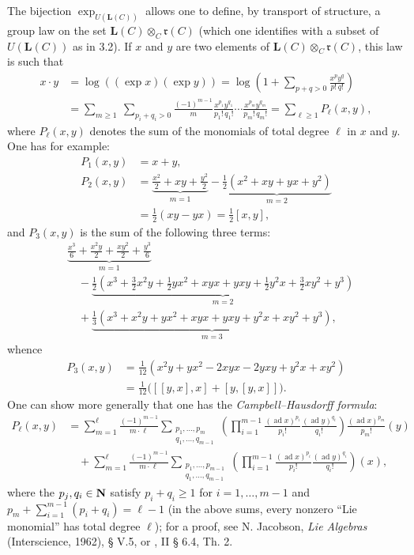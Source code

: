 The bijection $\exp_{U(\mathbf L(C))}$ allows one to define, by transport of structure, a group law on the set $\mathbf L(C)\otimes_C\mathfrak r(C)$ (which one identifies with a subset of $U(\mathbf L(C))$ as in 3.2). If $x$ and $y$ are two elements of $\mathbf L(C)\otimes_C\mathfrak r(C)$, this law is such that
\[
\begin{aligned}
x\cdot y&=\log((\exp x)(\exp y))=\log\left(1+\sum_{p+q>0}\frac{x^py^q}{p!\,q!}\right)\\
&=\sum_{m\ge1}\ \sum_{p_i+q_i>0}\frac{(-1)^{m-1}}m\frac{x^{p_1}y^{q_1}}{p_1!\,q_1!}\cdots\frac{x^{p_m}y^{q_m}}{p_m!\,q_m!}
=\sum_{\ell\ge1}P_\ell(x,y),
\end{aligned}
\]
where $P_\ell(x,y)$ denotes the sum of the monomials of total degree $\ell$ in $x$ and $y$. One has for example:
\[
\begin{aligned}
P_1(x,y)&=x+y,\\
P_2(x,y)&=\underbrace{\frac{x^2}2+xy+\frac{y^2}2}_{m=1}-\underbrace{\frac12(x^2+xy+yx+y^2)}_{m=2}\\
&=\frac12(xy-yx)=\frac12[x,y],
\end{aligned}
\]
and $P_3(x,y)$ is the sum of the following three terms:
\[
\begin{aligned}
&\underbrace{\frac{x^3}6+\frac{x^2y}2+\frac{xy^2}2+\frac{y^3}6}_{m=1}\\
&\quad-\underbrace{\frac12\left(x^3+\frac32x^2y+\frac12yx^2+xyx+yxy+\frac12y^2x+\frac32xy^2+y^3\right)}_{m=2}\\
&\quad+\underbrace{\frac13(x^3+x^2y+yx^2+xyx+yxy+y^2x+xy^2+y^3)}_{m=3},
\end{aligned}
\]
whence
\[
\begin{aligned}
P_3(x,y)&=\frac1{12}(x^2y+yx^2-2xyx-2yxy+y^2x+xy^2)\\
&=\frac1{12}\bigl([[y,x],x]+[y,[y,x]]\bigr).
\end{aligned}
\]
One can show more generally that one has the \emph{Campbell--Hausdorff formula}:
\[
\begin{aligned}
P_\ell(x,y)&=\sum_{m=1}^{\ell}\frac{(-1)^{m-1}}{m\cdot\ell}
\sum_{\substack{p_1,\ldots,p_m\\q_1,\ldots,q_{m-1}}}
\left(\prod_{i=1}^{m-1}\frac{(\operatorname{ad}x)^{p_i}}{p_i!}\frac{(\operatorname{ad}y)^{q_i}}{q_i!}\right)
\frac{(\operatorname{ad}x)^{p_m}}{p_m!}(y)\\
&\quad+\sum_{m=1}^{\ell}\frac{(-1)^{m-1}}{m\cdot\ell}
\sum_{\substack{p_1,\ldots,p_{m-1}\\q_1,\ldots,q_{m-1}}}
\left(\prod_{i=1}^{m-1}\frac{(\operatorname{ad}x)^{p_i}}{p_i!}\frac{(\operatorname{ad}y)^{q_i}}{q_i!}\right)(x),
\end{aligned}
\]
where the $p_j,q_i\in\mathbf{N}$ satisfy $p_i+q_i\ge1$ for $i=1,\ldots,m-1$ and $p_m+\sum_{i=1}^{m-1}(p_i+q_i)=\ell-1$ (\ie in the above sums, every nonzero ``Lie monomial'' has total degree $\ell$); for a proof, see N. Jacobson, \textit{Lie Algebras} (Interscience, 1962), § V.5, or \cite{BLie}, II § 6.4, Th. 2.

